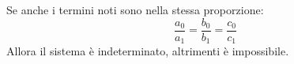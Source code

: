 Se anche i termini noti sono nella stessa proporzione:
\[\frac{a_{0}}{a_{1}} = \frac{b_{0}}{b_{1}} = \frac{c_{0}}{c_{1}}\]
Allora il sistema è indeterminato, altrimenti è impossibile.
% 
% 
% 
% 
% 
% 
% 
% 
% 
% 
% 
% 
% 
